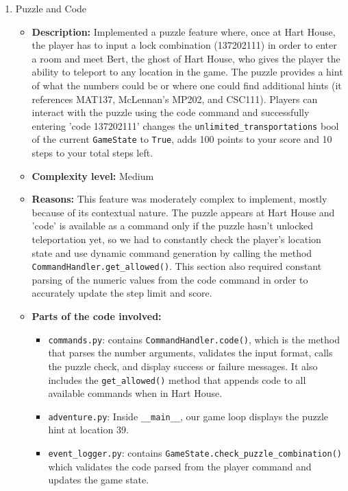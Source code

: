 \documentclass[11pt]{article}
\begin{document}
\begin{enumerate}
\begin{itemize}
        \item \textbf{Demo commands:} Any command demonstrates this, as they're all routed through the handler.
    \end{itemize}

    \item Puzzle and Code
    \begin{itemize}
        \item \textbf{Description:} Implemented a puzzle feature where, once at Hart House, the player has to input a lock combination (137202111) in order to enter a room and meet Bert, the ghost of Hart House, who gives the player the ability to teleport to any location in the game. The puzzle provides a hint of what the numbers could be or where one could find additional hints (it references MAT137, McLennan's MP202, and CSC111). Players can interact with the puzzle using the code command and successfully entering 'code 137202111' changes the \texttt{unlimited\_transportations} bool of the current \texttt{GameState} to \texttt{True}, adds 100 points to your score and 10 steps to your total steps left.
    
        \item \textbf{Complexity level:} Medium
    
        \item \textbf{Reasons:} This feature was moderately complex to implement, mostly because of its contextual nature. The puzzle appears at Hart House and 'code' is available as a command only if the puzzle hasn't unlocked teleportation yet, so we had to constantly check the player's location state and use dynamic command generation by calling the method \verb|CommandHandler.get_allowed()|. This section also required constant parsing of the numeric values from the code command in order to accurately update the step limit and score.
    
        \item \textbf{Parts of the code involved:}
        \begin{itemize}
            \item \verb|commands.py|: contains \verb|CommandHandler.code()|, which is the method that parses the number arguments, validates the input format, calls the puzzle check, and display success or failure messages. It also includes the \verb|get_allowed()| method that appends code to all available commands when in Hart House.
            \item \verb|adventure.py|: Inside \verb|__main__|, our game loop displays the puzzle hint at location 39.
            \item \verb|event_logger.py|: contains \verb|GameState.check_puzzle_combination()| which validates the code parsed from the player command and updates the game state.
        \end{itemize}
    

\end{itemize}
\end{enumerate}
\end{document}

